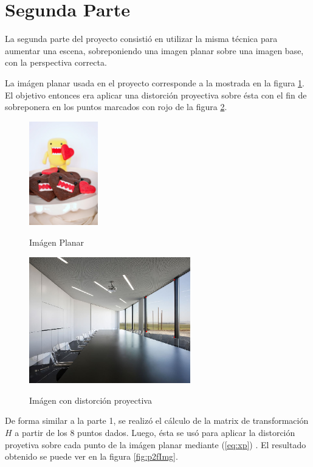 \documentclass{IEEEtran}
\begin{document}
\section{Segunda Parte}

La segunda parte del proyecto consistió en utilizar la misma técnica 
para aumentar una escena, sobreponiendo una imagen planar sobre 
una imagen base, con la perspectiva correcta.

La imágen planar usada en el proyecto corresponde a la mostrada en la figura
\ref{fig:p2Planar}. El objetivo entonces era aplicar una distorción
proyectiva sobre ésta con el fin de sobreponera en los puntos marcados
con rojo de la figura \ref{fig:p2iImg}.
\begin{figure}[H]
\caption{Imágen Planar}
\centering
\includegraphics[width=3cm,natwidth=500,natheight=753]{imgs/domokun.jpg}
\label{fig:p2Planar}
\end{figure} 

\begin{figure}[H]
\caption{Imágen con distorción proyectiva}
\centering
\includegraphics[width=7cm,natwidth=428,natheight=336]{imgs/p2iImg.png}
\label{fig:p2iImg}
\end{figure} 

De forma similar a la parte 1, se realizó el cálculo de la matrix de 
transformación $H$ a partir de los 8 puntos dados. Luego, ésta se usó
para aplicar la distorción proyetiva sobre cada punto de la imágen planar 
mediante (\ref{eq:xp}) .
El resultado obtenido se puede ver en la figura \ref{fig:p2fImg}.
\end{document}
